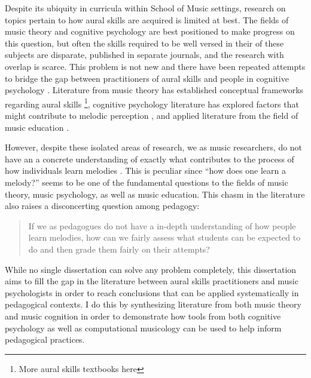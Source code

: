 \documentclass[]{book}
\let\rmarkdownfootnote\footnote%
\def\footnote{\protect\rmarkdownfootnote}
\begin{document}
Despite its ubiquity in curricula within School of Music settings, research on topics pertain to how aural skills are acquired is limited at best.
The fields of music theory and cognitive psychology are best positioned to make progress on this question, but often the skills required to be well versed in their of these subjects are disparate, published in separate journals, and the research with overlap is scarce.
This problem is not new and there have been repeated attempts to bridge the gap between practitioners of aural skills and people in cognitive psychology \citep{butlerBridgesUnbuiltComparing1993, davidbutlerWhyGulfMusic1997a, klonoskiImprovingDictationAuralSkills2006, klonoskiPerceptualLearningHierarchy2000, pembrookSendHelpAural1990, karpinskiAuralSkillsAcquisition2000}.
Literature from music theory has established conceptual frameworks regarding aural skills \citep{karpinskiAuralSkillsAcquisition2000}\footnote{More aural skills textbooks here}, cognitive psychology literature has explored factors that might contribute to melodic perception \citep{dowlingExpectancyAttentionMelody1990, dowlingScaleContourTwo1978, dowlingTonalStrengthMelody1991, halpernMemoryMelodies2010}, and applied literature from the field of music education \citep{buonviriEffectsTwoListening2017, buonviriMelodicDictationInstruction2015, paneyEffectDirectingAttention2016}.

However, despite these isolated areas of research, we as music researchers, do not have an a concrete understanding of exactly what contributes to the process of how individuals learn melodies \citep{halpernMemoryMelodies2010}.
This is peculiar since ``how does one learn a melody?'' seems to be one of the fundamental questions to the fields of music theory, music psychology, as well as music education.
This chasm in the literature also raises a disconcerting question among pedagogy:

\begin{quote}
If we as pedagogues do not have a in-depth understanding of how people learn melodies, how can we fairly assess what students can be expected to do and then grade them fairly on their attempts?
\end{quote}

While no single dissertation can solve any problem completely, this dissertation aims to fill the gap in the literature between aural skills practitioners and music psychologists in order to reach conclusions that can be applied systematically in pedagogical contexts.
I do this by synthesizing literature from both music theory and music cognition in order to demonstrate how tools from both cognitive psychology as well as computational musicology can be used to help inform pedagogical practices.
\end{document}
